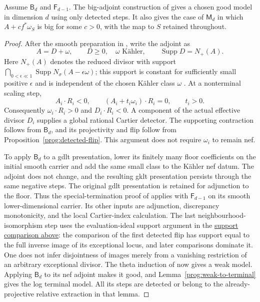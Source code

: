 \begin{lemma}
\label{prog:big-good-model}
Assume $\mathsf B_d$ and $\mathsf F_{d-1}$. The big-adjoint
construction of \cite[Section~5.1]{HX} gives a chosen good model in
dimension $d$ using only detected steps. It also gives the case of
$\mathsf M_d$ in which $A+c f^*\omega_S$ is big for some $c>0$,
with the map to $S$ retained throughout.
\end{lemma}

\begin{proof}
After the smooth preparation in \cite[Proposition~5.12]{HX}, write the
adjoint as
\[
 A=D+\omega,\qquad D\geq0,\quad \omega\text{ K\"ahler},
 \qquad \operatorname{Supp}D=N_+(A).
\]
Here $N_+(A)$ denotes the reduced divisor with support
$\bigcap_{0<\epsilon\ll1}\operatorname{Supp}N_\sigma(A-\epsilon\omega)$;
this support is constant for sufficiently small positive $\epsilon$
and is independent of the chosen Kähler class $\omega$
\cite[Lemma~5.3]{HX}. At a nonterminal scaling step,
\[
 A_i\cdot R_i<0,\qquad
 (A_i+t_i\omega_i)\cdot R_i=0,\qquad t_i>0.
\]
Consequently $\omega_i\cdot R_i>0$ and $D_i\cdot R_i<0$.
A component of the actual effective divisor $D_i$ supplies a global
rational Cartier detector. The supporting contraction follows from
$\mathsf B_d$, and its projectivity and flip follow from
Proposition~\ref{prog:detected-flip}. This argument does not require
$\omega_i$ to remain nef.

To apply $\mathsf B_d$ to a gdlt presentation, lower its finitely many
floor coefficients on the initial smooth carrier and add the same small
class to the K\"ahler nef datum. The adjoint does not change, and the
resulting gklt presentation persists through the same negative steps.
The original gdlt presentation is retained for adjunction to the floor.
Thus the special-termination proof of \cite[Lemma~5.8]{HX} applies with
$\mathsf F_{d-1}$ on its smooth lower-dimensional carrier. Its other
inputs are adjunction, discrepancy monotonicity, and the local
Cartier-index calculation. The last neighbourhood-isomorphism step
uses the evaluation-ideal support argument in
the \hyperref[prog:special-support]{support comparison above}: the comparison of
the first detected flip has support equal to the full inverse image
of its exceptional locus, and later comparisons dominate it.
One does not infer disjointness of images merely from a vanishing
restriction of an arbitrary exceptional divisor. The theta induction of
\cite[Proposition~5.11]{HX} now gives a weak model. Applying
$\mathsf B_d$ to its nef adjoint makes it good, and
Lemma~\ref{prog:weak-to-terminal} gives the log terminal model.
All its steps are detected or belong to the already-projective
relative extraction in that lemma.


\end{proof}
